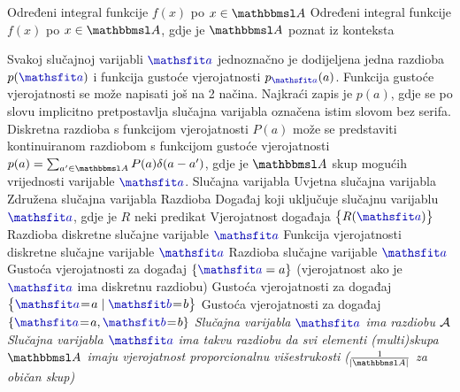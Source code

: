  {Određeni integral funkcije $f(x)$ po $x\in\set A$}
 {Određeni integral funkcije $f(x)$ po $x\in\set A$, gdje je $\set A$ poznat iz konteksta}

{Svakoj slučajnoj varijabli $\rvar a$ jednoznačno je dodijeljena jedna razdioba $p(\rvar a)$ i funkcija gustoće vjerojatnosti $p_{\rvar a}(a)$. Funkcija gustoće vjerojatnosti se može napisati još na 2 načina. Najkraći  zapis je $p(a)$, gdje se po slovu implicitno pretpostavlja slučajna varijabla označena istim slovom bez serifa. Diskretna razdioba s funkcijom vjerojatnosti $P(a)$ može se predstaviti kontinuiranom razdiobom s funkcijom gustoće vjerojatnosti $p(a)=\sum_{a'\in\set A} P(a) \dirac(a-a')$, gdje je $\set A$ skup mogućih vrijednosti varijable $\rvar a$.}
 {Slučajna varijabla}
 {Uvjetna slučajna varijabla}
 {Združena slučajna varijabla}
 {Razdioba}
 {Događaj koji uključuje slučajnu varijablu $\rvar a$, gdje je $R$ neki predikat}
 {Vjerojatnost događaja $\cbr{R(\rvar a)}$}
 {Razdioba diskretne slučajne varijable $\rvar a$}
 {Funkcija vjerojatnosti diskretne slučajne varijable $\rvar a$}
 {Razdioba slučajne varijable $\rvar a$}
 {Gustoća vjerojatnosti za događaj $\cbr{\rvar a=a}$ (vjerojatnost ako je $\rvar a$ ima diskretnu razdiobu)}
 {Gustoća vjerojatnosti za događaj $\cbr{\rvar a\sheq a\mid\rvar b\sheq b}$}
 {Gustoća vjerojatnosti za događaj $\cbr{\rvar a\sheq a,\rvar b\sheq b}$}
 {\textit{Slučajna varijabla $\rvar a$ ima razdiobu $\mathcal{A}$}}
 	{\textit{Slučajna varijabla $\rvar a$ ima takvu razdiobu da svi elementi (multi)skupa $\set A$ imaju vjerojatnost proporcionalnu višestrukosti ($\frac{1}{\envert{\set A}}$ za običan skup)}}
